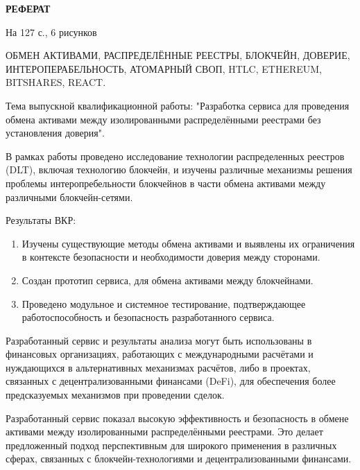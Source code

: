 \begin{center}
\textbf{РЕФЕРАТ}
\end{center}
\vspace{4pt}

На 127 с., 6 рисунков

\noindent ОБМЕН АКТИВАМИ, РАСПРЕДЕЛЁННЫЕ РЕЕСТРЫ, БЛОКЧЕЙН, ДОВЕРИЕ, ИНТЕРОПЕРАБЕЛЬНОСТЬ, АТОМАРНЫЙ СВОП, HTLC, ETHEREUM, BITSHARES, REACT.

\vspace{4pt}

Тема выпускной квалификационной работы: "Разработка сервиса для проведения обмена активами между изолированными распределёнными реестрами без установления доверия".

В рамках работы проведено исследование технологии распределенных реестров (DLT), включая технологию блокчейн, и изучены различные механизмы решения проблемы интеропребельности блокчейнов в части обмена активами между различными блокчейн-сетями.

Результаты ВКР:
\begin{enumerate}
\item Изучены существующие методы обмена активами и выявлены их ограничения в контексте безопасности и необходимости доверия между сторонами.
\item Создан прототип сервиса, для обмена активами между блокчейнами.
\item Проведено модульное и системное тестирование, подтверждающее работоспособность и безопасность разработанного сервиса.
\end{enumerate}

Разработанный сервис и результаты анализа могут быть использованы в финансовых организациях, работающих с международными расчётами и нуждающихся в альтернативных механизмах расчётов, либо в проектах, связанных с децентрализованными финансами (DeFi), для обеспечения более предсказуемых механизмов при проведении сделок.

Разработанный сервис показал высокую эффективность и безопасность в обмене активами между изолированными распределёнными реестрами. Это делает предложенный подход перспективным для широкого применения в различных сферах, связанных с блокчейн-технологиями и децентрализованными финансами.